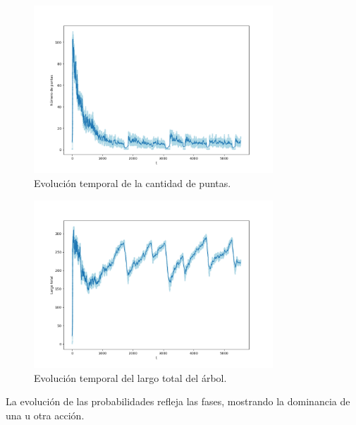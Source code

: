 \documentclass{article}
\begin{document}
\newpage
\begin{figure}[h!]
    \centering
    \includegraphics[width=0.8\textwidth]{graficos_inst/N_vs_tiempo.png}
    \caption[]{Evolución temporal de la cantidad de puntas.\footnotemark}
    \label{fig:evolucion_N}
\end{figure}
\begin{figure}[h!]
    \centering
    \includegraphics[width=0.8\textwidth]{graficos_inst/largo_vs_tiempo.png}
    \caption{Evolución temporal del largo total del árbol.}
    \label{fig:evolucion_tamano}
\end{figure}

\newpage

La evolución de las probabilidades refleja las fases, mostrando la dominancia de una u otra acción.
\end{document}
